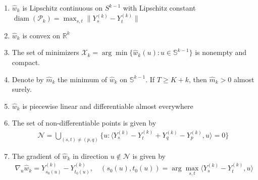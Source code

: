 \begin{Prop}\label{prop:properties_empirical_width}
    \begin{enumerate}
        \item[1.] $\hat{w}_k$ is Lipschitz continuous on $S^{k-1}$ with Lipschitz constant $\operatorname{diam}(\mathcal{P}_k)=\max_{s,t}\|Y_s^{(k)}-Y_t^{(k)}\|$
        \item[2.] $\hat{w}_k$ is convex on $\mathbb{R}^{k}$
        \item[3.] The set of minimizers $\mathcal{X}_k=\arg\min\{\hat{w}_k(u):u\in\mathbb{S}^{k-1}\}$ is nonempty and compact.
        \item[4.] Denote by $\hat{m}_k$ the minimum of $\hat{w}_k$ on $\mathbb{S}^{k-1}$. If $T\ge K+k$, then $\hat{m}_k>0$ almost surely.
        \item[5.] $\hat{w}_k$ is piecewise linear and differentiable almost everywhere
        \item[6.] The set of non-differentiable points is given by
        \begin{align*}
            \mathcal{N}=\bigcup_{(s,t)\ne(p,q)}\{u:\langle Y_s^{(k)}-Y_{t}^{(k)}+Y_q^{(k)}-Y_p^{(k)},u\rangle=0\}
        \end{align*}
        \item[7.] The gradient of $\hat{w}_k$ in direction $u\notin\mathcal{N}$ is given by
        \begin{align*}
            \nabla_u\hat{w}_k=Y_{s_0(u)}^{(k)}-Y_{t_0(u)}^{(k)},\quad(s_0(u),t_0(u))=\arg\max_{s,t}\langle Y_s^{(k)}-Y_t^{(k)},u\rangle
        \end{align*}
    \end{enumerate}
\end{Prop}

